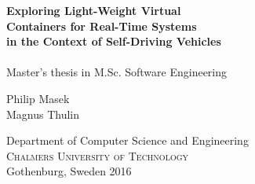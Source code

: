 
\begin{titlepage}
			
\addtolength{\voffset}{2cm}

 
\mbox{}
\vfill
\renewcommand{\familydefault}{\sfdefault} \normalfont %
\textbf{{\Huge 	Exploring Light-Weight Virtual \\[0.2cm] Containers for Real-Time Systems\\[0.2cm] 
				in the Context of Self-Driving Vehicles \\[0.2cm] 
				}} 	\\[1cm]

Master's thesis in M.Sc. Software Engineering \setlength{\parskip}{1cm}

{\Large Philip Masek} \setlength{\parskip}{2.9cm}\newline\\
{\Large Magnus Thulin} \setlength{\parskip}{2.9cm}

Department of Computer Science and Engineering \\
\textsc{Chalmers University of Technology} \\
Gothenburg, Sweden 2016

\renewcommand{\familydefault}{\rmdefault} \normalfont %
\end{titlepage}


\newpage
\restoregeometry
\thispagestyle{empty}
\mbox{}

